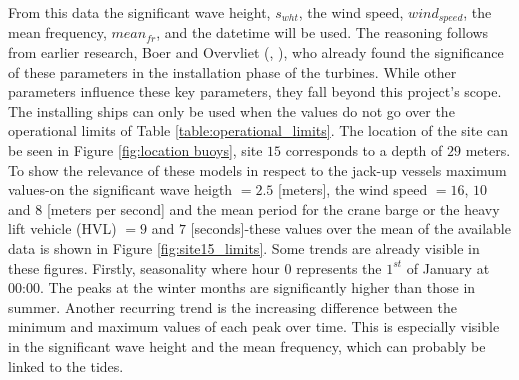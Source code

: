 \begin{table}[ht!]
\centering
\caption{Met-ocean Data hour 1}
\renewcommand{\arraystretch}{1.5} %
\label{table:metocean_data}
\end{table}

\noindent From this data the significant wave height, $s_{wht}$, the wind speed, $wind_{speed}$, the mean frequency, $mean_{fr}$, and the datetime will be used. The reasoning follows from earlier research, Boer and Overvliet (\cite{boer2022installation}, \cite{overvliet2023uncertainty}), who already found the significance of these parameters in the installation phase of the turbines. While other parameters influence these key parameters, they fall beyond this project's scope. The installing ships can only be used when the values do not go over the operational limits of Table \ref{table:operational_limits}. The location of the site can be seen in Figure \ref{fig:location buoys}, site $15$ corresponds to a depth of $29$ meters. \\

\noindent To show the relevance of these models in respect to the jack-up vessels maximum values-on the significant wave heigth $=2.5$ [meters], the wind speed $=16$, $10$ and $8$ [meters per second] and the mean period for the crane barge or the heavy lift vehicle (HVL) $=9$ and $7$ [seconds]-these values over the mean of the available data is shown in Figure \ref{fig:site15_limits}. Some trends are already visible in these figures. Firstly, seasonality where hour $0$ represents the $1^{st}$ of January at 00:00. The peaks at the winter months are significantly higher than those in summer. Another recurring trend is the increasing difference between the minimum and maximum values of each peak over time. This is especially visible in the significant wave height and the mean frequency, which can probably be linked to the tides. 

